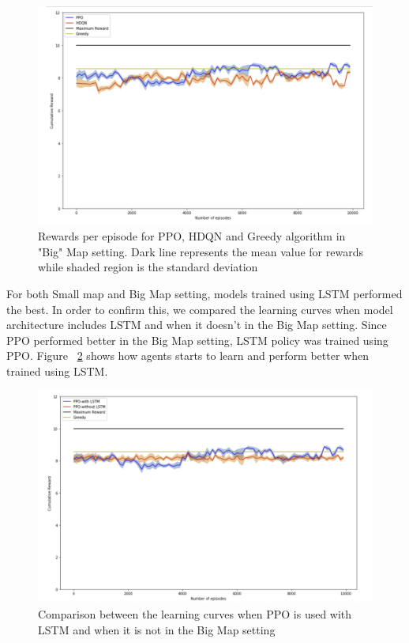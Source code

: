 \documentclass[12pt]{report}
\begin{document}
\begin{figure}[!h]
    \centering
    \includegraphics[width=16cm]{LearningCurve_BigMap.png}
    \caption{Rewards per episode for PPO, HDQN and Greedy algorithm in "Big" Map setting. Dark line represents the mean value for rewards while shaded region is the standard deviation}
    \label{fig:BigMapResults}
\end{figure}

For both Small map and Big Map setting, models trained using LSTM performed the best. In order to confirm this, we compared the learning curves when model architecture includes LSTM and when it doesn't in the Big Map setting. Since PPO performed better in the Big Map setting, LSTM policy was trained using PPO. Figure ~\ref{fig:PPOLSTMCompares} shows how agents starts to learn and perform better when trained using LSTM. 

\begin{figure}[!h]
    \centering
    \includegraphics[width=16cm]{PPOLSTMCompare.png}
    \caption{Comparison between the learning curves when PPO is used with LSTM and when it is not in the Big Map setting}
    \label{fig:PPOLSTMCompares}
\end{figure}
\end{document}
